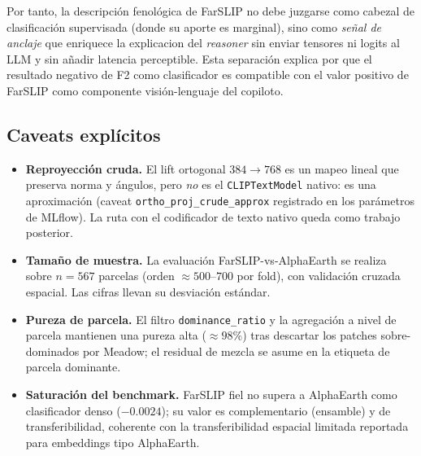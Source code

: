 Por tanto, la descripción fenológica de FarSLIP no debe juzgarse como cabezal de
clasificación supervisada (donde su aporte es marginal), sino como \textit{señal
de anclaje} que enriquece la explicacion del \textit{reasoner} sin enviar
tensores ni logits al LLM y sin añadir latencia perceptible. Esta separación
explica por que el resultado negativo de F2 como clasificador es compatible con
el valor positivo de FarSLIP como componente visión-lenguaje del copiloto.

\subsection{Caveats explícitos}
\label{sec:farslip_caveats}

\begin{itemize}[leftmargin=*]
    \item \textbf{Reproyección cruda.} El lift ortogonal $384\rightarrow768$ es
    un mapeo lineal que preserva norma y ángulos, pero \textit{no} es el
    \texttt{CLIPTextModel} nativo: es una aproximación (caveat
    \texttt{ortho\_proj\_crude\_approx} registrado en los parámetros de MLflow).
    La ruta con el codificador de texto nativo queda como trabajo posterior.
    \item \textbf{Tamaño de muestra.} La evaluación FarSLIP-vs-AlphaEarth se
    realiza sobre $n=567$ parcelas (orden $\approx500$--$700$ por fold), con
    validación cruzada espacial. Las cifras llevan su desviación estándar.
    \item \textbf{Pureza de parcela.} El filtro \texttt{dominance\_ratio} y la
    agregación a nivel de parcela mantienen una pureza alta ($\approx98\%$) tras
    descartar los patches sobre-dominados por Meadow; el residual de mezcla se
    asume en la etiqueta de parcela dominante.
    \item \textbf{Saturación del benchmark.} FarSLIP fiel no supera a AlphaEarth
    como clasificador denso ($-0.0024$); su valor es complementario (ensamble) y
    de transferibilidad, coherente con la transferibilidad espacial limitada
    reportada para embeddings tipo AlphaEarth.
\end{itemize}
